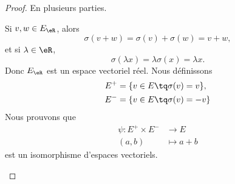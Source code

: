 \begin{proof}
	En plusieurs parties.
	\begin{subproof}
		Si \( v,w\in E_{\eR}\), alors
		\begin{equation}
			\sigma(v+w)=\sigma(v)+\sigma(w)=v+w,
		\end{equation}
		et si \( \lambda\in \eR\),
		\begin{equation}
			\sigma(\lambda x)=\lambda\sigma(x)=\lambda x.
		\end{equation}
		Donc \( E_{\eR}\) est un espace vectoriel réel.
		Nous définissons
		\begin{subequations}
			\begin{align}
				E^+ & =\{ v\in E\tq \sigma(v)=v   \}, \\
				E^- & =\{ v\in E\tq \sigma(v)=-v  \}
			\end{align}
		\end{subequations}
		Nous prouvons que
		\begin{equation}
			\begin{aligned}
				\psi\colon E^+\times E^- & \to E       \\
				(a,b)                    & \mapsto a+b
			\end{aligned}
		\end{equation}
		est un isomorphisme d'espaces vectoriels.


\end{subproof}
\end{proof}
